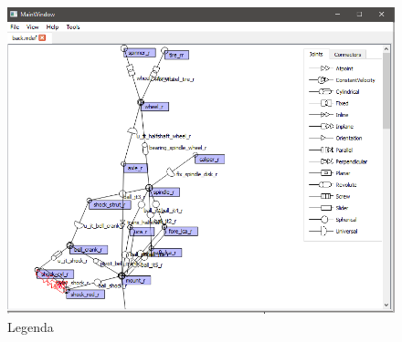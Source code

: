 \begin{figure}[H]
    \includegraphics[width=\linewidth]{imagini/implementare/legend.png}
    \caption{Legenda}
    \label{fig:tabs}
\end{figure}
